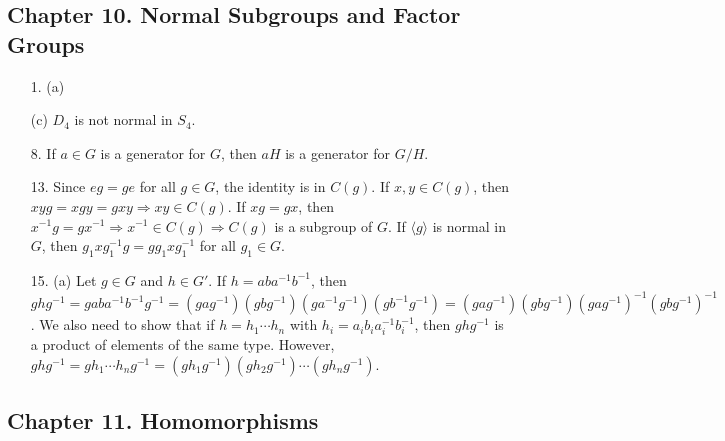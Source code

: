 \subsection*{Chapter 10. Normal Subgroups and Factor Groups}
 
{\small
\begin{itemize}
 
\item[1.]
(a)

(c) $D_4$ is not normal in $S_4$.
 
 


 
\item[8.]
If $a \in G$ is a generator for $G$, then $aH$ is a generator for $G/H$.
 
\item[13.]
Since $eg = ge$ for all $g \in G$, the identity is in $C(g)$. If $x,
y \in C(g)$, then $xy g = x g y = g xy \Rightarrow xy \in C(g)$.  If
$x g = g x$, then $x^{-1} g = g x^{-1} \Rightarrow x^{-1} \in C(g)
\Rightarrow C(g)$ is a subgroup of $G$. If $\langle g \rangle$ is
normal in $G$, then $g_1 x g_1^{-1} g = g g_1 x g_1^{-1}$ for all $g_1
\in G$.
 
\item[15.]
(a)
Let $g \in G$ and $h \in G'$. If $h = aba^{-1}b^{-1}$, then $ghg^{-1}
= gaba^{-1}b^{-1}g^{-1} 
= (gag^{-1})(gbg^{-1})(ga^{-1}g^{-1})(gb^{-1}g^{-1}) 
= (gag^{-1})(gbg^{-1})(gag^{-1})^{-1}(gbg^{-1})^{-1}$. We also need to
show that if $h = h_1 \cdots h_n$ with $h_i = a_i b_i a_i^{-1}
b_i^{-1}$, then $ghg^{-1}$ is a product of elements of the same type.
However, $ghg^{-1} = g h_1 \cdots h_n g^{-1} =
(gh_1g^{-1})(gh_2g^{-1}) \cdots (gh_ng^{-1})$.
 
 
 
 
\end{itemize}
}

\subsection*{Chapter 11. Homomorphisms}
 

